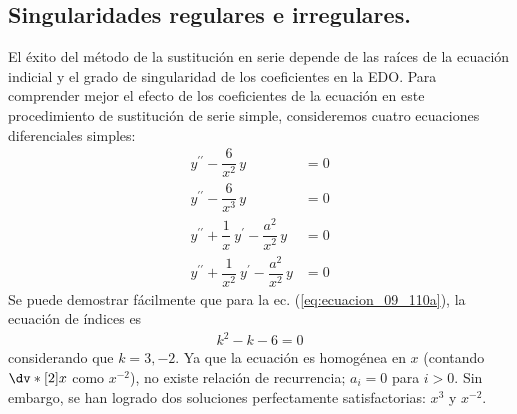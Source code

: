 \subsection*{Singularidades regulares e irregulares.}
El éxito del método de la sustitución en serie depende de las raíces de la ecuación indicial y el grado de singularidad de los coeficientes en la EDO. Para comprender mejor el efecto de los coeficientes de la ecuación en este procedimiento de sustitución de serie simple, consideremos cuatro ecuaciones diferenciales simples:
\begin{subequations}
\begin{align}
y^{\prime \prime} - \dfrac{6}{x^{2}} \, y &= 0 \label{eq:ecuacion_09_110a} \\[0.25em]
y^{\prime \prime} - \dfrac{6}{x^{3}} \, y &= 0 \label{eq:ecuacion_09_110b} \\[0.25em]
y^{\prime \prime} + \dfrac{1}{x} \: y^{\prime} - \dfrac{a^{2}}{x^{2}} \, y &= 0 \label{eq:ecuacion_09_110c} \\[0.25em]
y^{\prime \prime} + \dfrac{1}{x^{2}} \: y^{\prime} - \dfrac{a^{2}}{x^{2}} \, y &= 0 \label{eq:ecuacion_09_110d}
\end{align}
\end{subequations}
Se puede demostrar fácilmente que para la ec. (\ref{eq:ecuacion_09_110a}), la ecuación de índices es
\begin{align*}
k^{2} - k - 6 = 0
\end{align*}
considerando que $k = 3, -2$. Ya que la ecuación es homogénea en $x$ (contando $\dv*[2]{x}$ como $x^{-2}$), no existe relación de recurrencia; $a_{i} = 0$ para $i > 0$. Sin embargo, se han logrado dos soluciones perfectamente satisfactorias: $x^{3}$ y $x^{-2}$.

